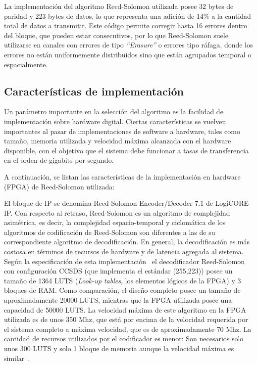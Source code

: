 La implementación del algoritmo Reed-Solomon utilizada posee 32 bytes de paridad y 223 bytes de datos, lo que representa una adición de 14\% a la cantidad total de datos a transmitir. Este código permite corregir hasta 16 errores dentro del bloque, que pueden estar consecutivos, por lo que Reed-Solomon suele utilizarse en canales con errores de tipo \textit{``Erasure''} o errores tipo ráfaga, donde los errores no están uniformemente distribuidos sino que están agrupados temporal o espacialmente.


\subsection{Características de implementación}
Un parámetro importante en la selección del algoritmo es la facilidad de implementación sobre hardware digital. Ciertas características se vuelven importantes al pasar de implementaciones de software a hardware, tales como tamaño, memoria utilizada y velocidad máxima alcanzada con el hardware disponible, con el objetivo que el sistema debe funcionar a tasas de transferencia en el orden de gigabits por segundo.

A continuación, se listan las características de la implementación en hardware (FPGA) de Reed-Solomon utilizada:

El bloque de IP se denomina Reed-Solomon Encoder/Decoder 7.1 de LogiCORE IP. Con respecto al retraso, Reed-Solomon es un algoritmo de complejidad asimétrica, es decir, la complejidad espacio-temporal y ciclomática \cite{mccabe1976complexity} de los algoritmos de codificación de Reed-Solomon son diferentes a las de su correspondiente algoritmo de decodificación. En general, la decodificación es más costosa en términos de recursos de hardware y de latencia agregada al sistema. Según la especificación de esta implementación~\cite{Xilinx:DS252} el decodificador Reed-Solomon con configuración CCSDS \cite{coding1999consultative} (que implementa el estándar (255,223)) posee un tamaño de 1364 LUTS (\textit{Look-up tables}, los elementos lógicos de la FPGA) y 3 bloques de RAM. Como comparación, el diseño completo posee un tamaño de aproximadamente 20000 LUTS, mientras que la FPGA utilizada posee una capacidad de 50000 LUTS. La velocidad máxima de este algoritmo en la FPGA utilizada es de unos 350 Mhz, que está por encima de la velocidad requerida por el sistema completo a máxima velocidad, que es de aproximadamente 70 Mhz.
La cantidad de recursos utilizados por el codificador es menor: Son necesarios solo unos 300 LUTS y solo 1 bloque de memoria aunque la velocidad máxima es similar~\cite{Xilinx:DS251}.

